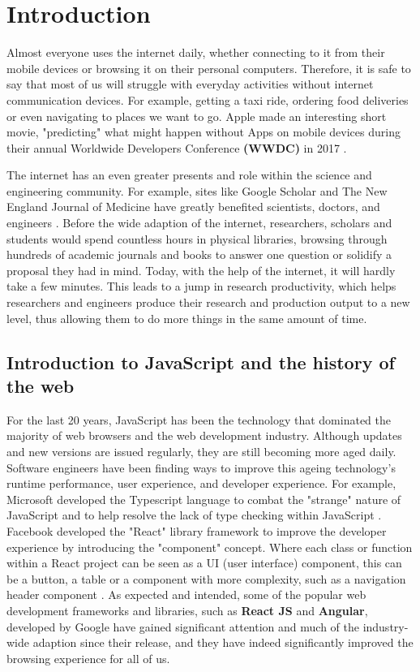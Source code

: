 \chapter{Introduction}

Almost everyone uses the internet daily, whether connecting to it from their mobile devices or browsing it on their personal computers. Therefore, it is safe to say that most of us will struggle with everyday activities without internet communication devices. For example, getting a taxi ride, ordering food deliveries or even navigating to places we want to go. Apple made an interesting short movie, "predicting" what might happen without Apps on mobile devices during their annual Worldwide Developers Conference \textbf{(WWDC)} in 2017 \cite{int1}.
 
The internet has an even greater presents and role within the science and engineering community. For example, sites like Google Scholar and The New England Journal of Medicine have greatly benefited scientists, doctors, and engineers \cite{int2} \cite{int3}. Before the wide adaption of the internet, researchers, scholars and students would spend countless hours in physical libraries, browsing through hundreds of academic journals and books to answer one question or solidify a proposal they had in mind. Today, with the help of the internet, it will hardly take a few minutes. This leads to a jump in research productivity, which helps researchers and engineers produce their research and production output to a new level, thus allowing them to do more things in the same amount of time.

\bigskip
\section{Introduction to JavaScript and the history of the web}

For the last 20 years, JavaScript has been the technology that dominated the majority of web browsers and the web development industry. Although updates and new versions are issued regularly, they are still becoming more aged daily. Software engineers have been finding ways to improve this ageing technology's runtime performance, user experience, and developer experience. For example, Microsoft developed the Typescript language to combat the "strange" nature of JavaScript and to help resolve the lack of type checking within JavaScript \cite{int4} \cite{int5}. Facebook developed the "React" library framework to improve the developer experience by introducing the "component" concept. Where each class or function within a React project can be seen as a UI (user interface) component, this can be a button, a table or a component with more complexity, such as a navigation header component \cite{int6}. As expected and intended, some of the popular web development frameworks and libraries, such as \textbf{React JS} and \textbf{Angular}, developed by Google have gained significant attention and much of the industry-wide adaption since their release, and they have indeed significantly improved the browsing experience for all of us.

